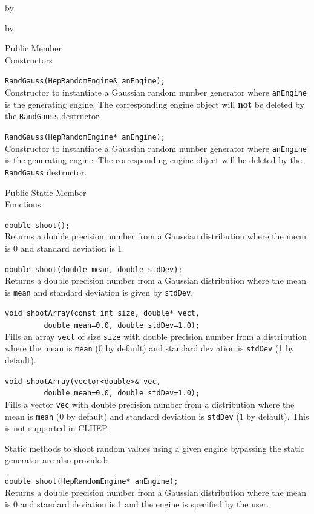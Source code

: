 \documentclass[twoside]{article}
\newcommand{\comp}[1]{\texttt{#1}}%
\newcommand{\entrylabel}[1]{\mbox{\textbf{{#1}}}\hfil}%
\newenvironment{entry}
{\begin{list}{}%
    {\renewcommand{\makelabel}{\entrylabel}%
     \setlength{\labelwidth}{90pt}%
     \setlength{\leftmargin}{\labelwidth}
     \advance\leftmargin by \labelsep%
      }%
    }%
  {\end{list}}
\newcommand{\Entrylabel}[1]%
{\raisebox{0pt}[1ex][0pt]{\makebox[\labelwidth][l]%
    {\parbox[t]{\labelwidth}{\hspace{0pt}\textbf{{#1}}}}}}
\newenvironment{Entry}%
{\renewcommand{\entrylabel}{\Entrylabel}\begin{entry}}%
  {\end{entry}}
\begin{document}
\begin{description}
\begin{Entry}
\begin{Entry}
\item[Public Member\\ Constructors]

   \verb+RandGauss(HepRandomEngine& anEngine);+\\
   Constructor to instantiate a Gaussian random number generator
   where \comp{anEngine} is the generating engine.  The corresponding
   engine object will {\bf not} be deleted by the \comp{RandGauss} destructor.
   
   \verb+RandGauss(HepRandomEngine* anEngine);+\\
   Constructor to instantiate a Gaussian random number generator
   where \comp{anEngine} is the generating engine.  The corresponding
   engine object will be deleted by the \comp{RandGauss} destructor.
  
\item[Public Static Member\\ Functions]
  
   \verb+double shoot();+\\
   Returns a double precision number from a Gaussian distribution where the
   mean is 0 and standard deviation is 1.
  
   \verb+double shoot(double mean, double stdDev);+\\
   Returns a double precision number from a Gaussian distribution where the
   mean is \comp{mean} and standard deviation is given by
   \comp{stdDev}.

  \verb+void shootArray(const int size, double* vect,+\\
  \verb+         double mean=0.0, double stdDev=1.0);+\\
  Fills an array \comp{vect} of size \comp{size} with double
  precision number from a distribution where the
  mean is \comp{mean} (0 by default) and standard
  deviation is \comp{stdDev} (1 by default).

  \verb+void shootArray(vector<double>& vec,+\\
  \verb+         double mean=0.0, double stdDev=1.0);+\\
  Fills a vector \comp{vec} with double
  precision number from a distribution where the
  mean is \comp{mean} (0 by default) and standard
  deviation is \comp{stdDev} (1 by default).  This is not
  supported in CLHEP.
  
  Static methods to shoot random values using a given engine
  bypassing the static generator are also provided:

  \verb+double shoot(HepRandomEngine* anEngine);+\\
  Returns a double precision number from a Gaussian distribution where the
  mean is 0 and standard deviation is 1
  and the engine is specified by the user.
  

\end{Entry}
\end{Entry}
\end{description}
\end{document}

